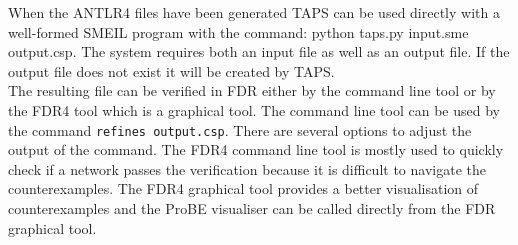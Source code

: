 When the ANTLR4 files have been generated TAPS can be used directly with a well-formed SMEIL program with the command: {\ttfamily python taps.py input.sme output.csp}. The system requires both an input file as well as an output file. If the output file does not exist it will be created by TAPS. \\

The resulting \cspm{} file can be verified in FDR either by the command line tool or by the FDR4 tool which is a graphical tool. The command line tool can be used by the command \texttt{refines output.csp}. There are several options to adjust the output of the command. The FDR4 command line tool is mostly used to quickly check if a network passes the verification because it is difficult to navigate the counterexamples. The FDR4 graphical tool provides a better visualisation of counterexamples and the ProBE visualiser can be called directly from the FDR graphical tool.

